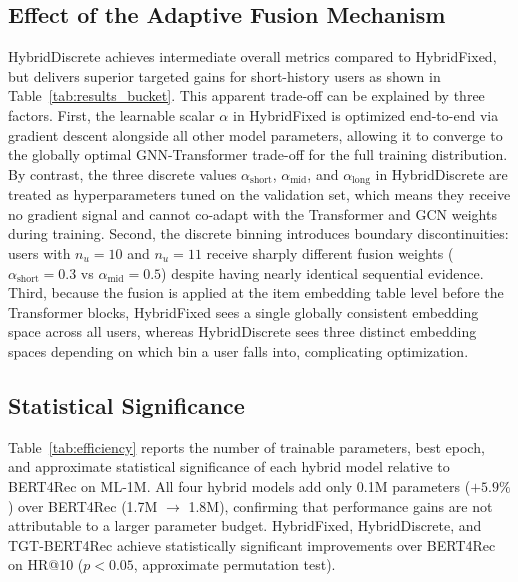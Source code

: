 \documentclass[12pt,a4paper]{report}
\begin{document}
\subsection*{Effect of the Adaptive Fusion Mechanism}

HybridDiscrete achieves intermediate overall metrics compared to HybridFixed,
but delivers superior targeted gains for short-history users as shown in
Table~\ref{tab:results_bucket}. This apparent trade-off can be explained by
three factors. First, the learnable scalar \(\alpha\) in HybridFixed is
optimized end-to-end via gradient descent alongside all other model parameters,
allowing it to converge to the globally optimal GNN-Transformer trade-off for
the full training distribution. By contrast, the three discrete values
\(\alpha_{\text{short}}\), \(\alpha_{\text{mid}}\), and \(\alpha_{\text{long}}\)
in HybridDiscrete are treated as hyperparameters tuned on the validation set,
which means they receive no gradient signal and cannot co-adapt with the
Transformer and GCN weights during training. Second, the discrete binning
introduces boundary discontinuities: users with \(n_u = 10\) and \(n_u = 11\)
receive sharply different fusion weights (\(\alpha_{\text{short}} = 0.3\) vs
\(\alpha_{\text{mid}} = 0.5\)) despite having nearly identical sequential
evidence. Third, because the fusion is applied at the item embedding table
level before the Transformer blocks, HybridFixed sees a single globally
consistent embedding space across all users, whereas HybridDiscrete sees three
distinct embedding spaces depending on which bin a user falls into,
complicating optimization.

\subsection*{Statistical Significance}

Table~\ref{tab:efficiency} reports the number of trainable parameters, best
epoch, and approximate statistical significance of each hybrid model relative
to BERT4Rec on ML-1M. All four hybrid models add only 0.1M parameters
(\(+5.9\%\)) over BERT4Rec (1.7M \(\rightarrow\) 1.8M), confirming that
performance gains are not attributable to a larger parameter budget.
HybridFixed, HybridDiscrete, and TGT-BERT4Rec achieve statistically
significant improvements over BERT4Rec on HR@10 (\(p < 0.05\), approximate
permutation test).
\end{document}
